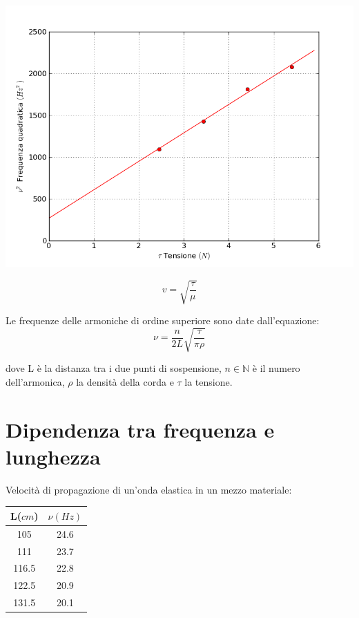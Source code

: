 \includegraphics[scale=0.75]{../grafici/corda_tensione}


\begin{equation}
v=\sqrt{\frac{\tau}{\mu}}
\end{equation}

Le frequenze delle armoniche di ordine superiore sono date dall'equazione:
\begin{equation}
\nu=\frac{n}{2L}\sqrt{\frac{\tau}{\pi\rho}}
\end{equation}

dove L è la distanza tra i due punti di sospensione, $n\in \mathbb{N}$ è il numero dell'armonica, $\rho$ la densità della corda e $\tau$ la tensione.


\section{Dipendenza tra frequenza e lunghezza}

Velocità di propagazione di un'onda elastica in un mezzo materiale:
\begin{center}


\begin{tabular}{c|c}
L($cm$) & $\nu (Hz) $ \\
\midrule
105 & 24.6\\
111 & 23.7\\
116.5 & 22.8 \\
122.5 & 20.9 \\
131.5 & 20.1 \\
\end{tabular}
\end{center}

